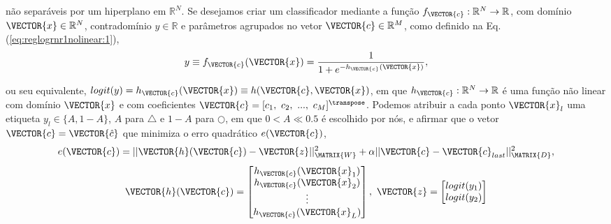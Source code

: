 \begin{theorem}
\begin{minipage}{0.55\textwidth}
não separáveis por um hiperplano  em $\mathbb{R}^{N}$.
Se desejamos criar um classificador mediante 
a função  $f_{\VECTOR{c}}:\mathbb{R}^{N} \rightarrow \mathbb{R}$,
com domínio $\VECTOR{x} \in \mathbb{R}^{N}$, contradomínio $y \in \mathbb{R}$ e 
parâmetros agrupados no vetor $\VECTOR{c} \in \mathbb{R}^{M}$,
como definido na Eq. (\ref{eq:reglogrnr1nolinear:1}),
\begin{equation}\label{eq:reglogrnr1nolinear:1}
y\equiv f_{\VECTOR{c}}(\VECTOR{x})= \frac{1}{1+e^{-h_{\VECTOR{c}}(\VECTOR{x})}},
\end{equation}
\end{minipage}
ou seu equivalente, $logit(y)=h_{\VECTOR{c}}(\VECTOR{x})\equiv h(\VECTOR{c},\VECTOR{x})$,
em que $h_{\VECTOR{c}}: \mathbb{R}^{N} \rightarrow \mathbb{R}$ é uma função não linear
com domínio $\VECTOR{x}$ e
com coeficientes $\VECTOR{c}=[c_1,~c_2,~...,~c_M]^{\transpose}$.
Podemos atribuir a cada ponto $\VECTOR{x}_l$ uma etiqueta $y_l\in \{A,1-A\}$, 
$A$ para $\bigtriangleup$ e  $1-A$ para $\bigcirc$,
em que $0<A\ll 0.5$ é escolhido por nós,
e afirmar que o vetor $\VECTOR{c}= \VECTOR{\hat{c}}$
que minimiza o erro quadrático $e(\VECTOR{c})$,
\begin{equation}\label{eq:reglogrnr1nolinear:1e}
e(\VECTOR{c}) =  ||\VECTOR{h}(\VECTOR{c})-\VECTOR{z}||_{\MATRIX{W}}^2 + \alpha||\VECTOR{c}-\VECTOR{c}_{last}||_{\MATRIX{D}}^2,
\end{equation}
\begin{equation}
\VECTOR{h}(\VECTOR{c})=\begin{bmatrix}
h_{\VECTOR{c}}(\VECTOR{x}_1)\\ 
h_{\VECTOR{c}}(\VECTOR{x}_2)\\ 
\vdots\\ 
h_{\VECTOR{c}}(\VECTOR{x}_L)
\end{bmatrix},
~
\VECTOR{z}=
\begin{bmatrix}
logit(y_1)  \\
logit(y_2)  \\

\end{bmatrix}
\end{equation}
\end{theorem}

